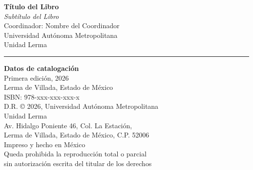 \begin{titlepage}
    \thispagestyle{empty}
    \vspace*{2cm}
    \begin{center}
        \textbf{Título del Libro} \\
        \textit{Subtítulo del Libro} \\
        \vspace{0.5cm}
        \small
        Coordinador: Nombre del Coordinador \\
        Universidad Autónoma Metropolitana \\
        Unidad Lerma \\
        
        
        \rule{0.6\textwidth}{0.4pt}
        \vspace{0.5cm}
        
        \small
        \textbf{Datos de catalogación} \\
        \vspace{0.3cm}
        Primera edición, 2026 \\
        Lerma de Villada, Estado de México \\
        \vspace{0.3cm}
        ISBN: 978-xxx-xxx-xxx-x \\
        D.R. © 2026, Universidad Autónoma Metropolitana \\
        Unidad Lerma \\
        Av. Hidalgo Poniente 46, Col. La Estación, \\
        Lerma de Villada, Estado de México, C.P. 52006 \\
        \vspace{0.3cm}
        Impreso y hecho en México \\
        \vspace{0.3cm}
        Queda prohibida la reproducción total o parcial \\
        sin autorización escrita del titular de los derechos
    \end{center}
\end{titlepage}

\clearpage
\pagestyle{plain}  %